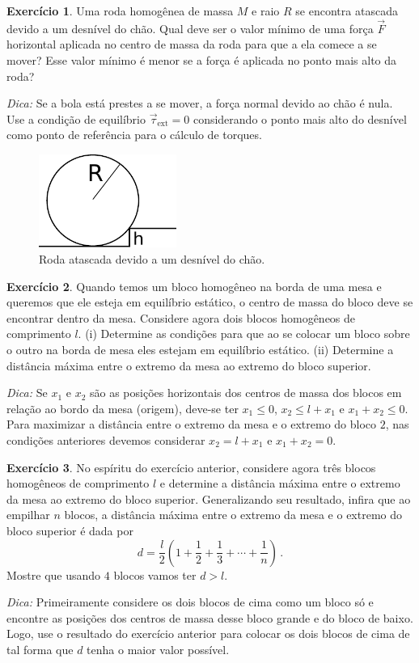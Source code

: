 \documentclass[papersize=a4,DIV=calc,twocolumn=on]{scrartcl}
\newcommand{\dpar}[1]{\left(#1\right)}
\theoremstyle{definition}
\newtheorem{ex}{Exercício}[section]
\begin{document}
\begin{ex}
  Uma roda homogênea de massa $M$ e raio $R$ se encontra atascada
  devido a um desnível do chão. Qual deve ser o valor mínimo de uma
  força $\vec F$ horizontal aplicada no centro de massa da roda para
  que a ela comece a se mover? Esse valor mínimo é menor se a força é
  aplicada no ponto mais alto da roda?

  \noindent\textit{Dica:} Se a bola está prestes a se mover, a força
  normal devido ao chão é nula. Use a condição de equilíbrio
  $\vec\tau_{\mathrm{ext}}=0$ considerando o ponto mais alto do
  desnível como ponto de referência para o cálculo de torques.
  \begin{figure}[ht]
    \centering
    \includegraphics[width=0.4\textwidth,keepaspectratio]{roda_obstaculo.pdf}
    \caption{Roda atascada devido a um desnível do chão.}
    \label{fig:roda_obstaculo}
  \end{figure}
\end{ex}

\begin{ex}
  Quando temos um bloco homogêneo na borda de uma mesa e queremos que
  ele esteja em equilíbrio estático, o centro de massa do bloco deve
  se encontrar dentro da mesa. Considere agora dois blocos homogêneos
  de comprimento $l$. (i) Determine as condições para que ao se
  colocar um bloco sobre o outro na borda de mesa eles estejam em
  equilíbrio estático. (ii) Determine a distância máxima entre o
  extremo da mesa ao extremo do bloco superior.

  \noindent\textit{Dica:} Se $x_1$ e $x_2$ são as posições horizontais
  dos centros de massa dos blocos em relação ao bordo da mesa
  (origem), deve-se ter $x_1\le 0$, $x_2\le l+x_1$ e $x_1+x_2\le
  0$. Para maximizar a distância entre o extremo da mesa e o extremo
  do bloco $2$, nas condições anteriores devemos considerar
  $x_2=l+x_1$ e $x_1+x_2=0$.
\end{ex}

\begin{ex}
  No espíritu do exercício anterior, considere agora três blocos
  homogêneos de comprimento $l$ e determine a distância máxima entre o
  extremo da mesa ao extremo do bloco superior. Generalizando seu
  resultado, infira que ao empilhar $n$ blocos, a distância máxima
  entre o extremo da mesa e o extremo do bloco superior é dada por
  $$d=\frac{l}{2}\dpar{1+\frac{1}{2}+\frac{1}{3}+\cdots+\frac{1}{n}}\,.$$
  Mostre que usando $4$ blocos vamos ter $d>l$.

  \noindent\textit{Dica:} Primeiramente considere os dois blocos de
  cima como um bloco só e encontre as posições dos centros de massa
  desse bloco grande e do bloco de baixo. Logo, use o resultado do
  exercício anterior para colocar os dois blocos de cima de tal forma
  que $d$ tenha o maior valor possível.
\end{ex}
\end{document}
